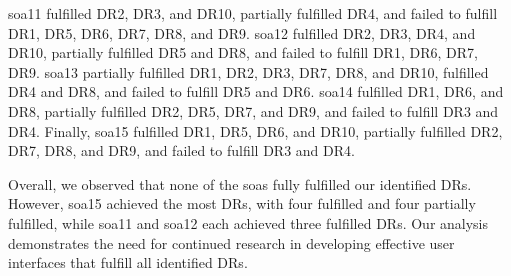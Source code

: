 \ac{soa}11 fulfilled DR2, DR3, and DR10, partially fulfilled DR4, and failed to fulfill DR1, DR5, DR6, DR7, DR8, and DR9. 
\ac{soa}12 fulfilled DR2, DR3, DR4, and DR10, partially fulfilled DR5 and DR8, and failed to fulfill DR1, DR6, DR7, DR9. 
\ac{soa}13 partially fulfilled DR1, DR2, DR3, DR7, DR8, and DR10, fulfilled DR4 and DR8, and failed to fulfill DR5 and DR6. 
\ac{soa}14 fulfilled DR1, DR6, and DR8, partially fulfilled DR2, DR5, DR7, and DR9, and failed to fulfill DR3 and DR4. 
Finally, \ac{soa}15 fulfilled DR1, DR5, DR6, and DR10, partially fulfilled DR2, DR7, DR8, and DR9, and failed to fulfill DR3 and DR4.

Overall, we observed that none of the \ac{soa}s fully fulfilled our identified DRs. 
However, \ac{soa}15 achieved the most DRs, with four fulfilled and four partially fulfilled, while \ac{soa}11 and \ac{soa}12 each achieved three fulfilled DRs. 
Our analysis demonstrates the need for continued research in developing effective user interfaces that fulfill all identified DRs.